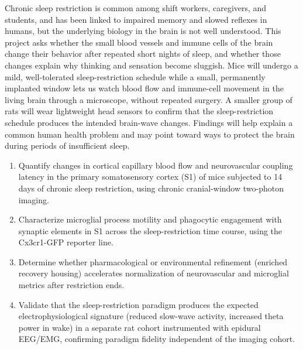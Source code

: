 

\begin{tcolorbox}[narrbox={2.1 Lay Summary (non-technical, for public IACUC minutes)}]
Chronic sleep restriction is common among shift workers, caregivers, and students, and has
been linked to impaired memory and slowed reflexes in humans, but the underlying biology in
the brain is not well understood. This project asks whether the small blood vessels and
immune cells of the brain change their behavior after repeated short nights of sleep, and
whether those changes explain why thinking and sensation become sluggish. Mice will undergo a
mild, well-tolerated sleep-restriction schedule while a small, permanently implanted window
lets us watch blood flow and immune-cell movement in the living brain through a microscope,
without repeated surgery. A smaller group of rats will wear lightweight head sensors to
confirm that the sleep-restriction schedule produces the intended brain-wave changes. Findings
will help explain a common human health problem and may point toward ways to protect the brain
during periods of insufficient sleep.
\end{tcolorbox}

\vspace{6pt}

\begin{tcolorbox}[narrbox={2.2 Specific Scientific Objectives}]
\begin{enumerate}[leftmargin=*, itemsep=3pt]
  \item Quantify changes in cortical capillary blood flow and neurovascular coupling latency
    in the primary somatosensory cortex (S1) of mice subjected to 14 days of chronic sleep
    restriction, using chronic cranial-window two-photon imaging.
  \item Characterize microglial process motility and phagocytic engagement with synaptic
    elements in S1 across the sleep-restriction time course, using the Cx3cr1-GFP reporter
    line.
  \item Determine whether pharmacological or environmental refinement (enriched recovery
    housing) accelerates normalization of neurovascular and microglial metrics after
    restriction ends.
  \item Validate that the sleep-restriction paradigm produces the expected electrophysiological
    signature (reduced slow-wave activity, increased theta power in wake) in a separate rat
    cohort instrumented with epidural EEG/EMG, confirming paradigm fidelity independent of the
    imaging cohort.
\end{enumerate}
\end{tcolorbox}

